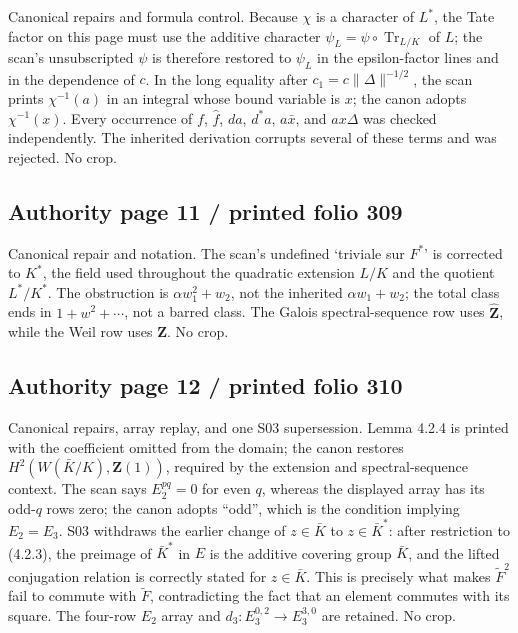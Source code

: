 \documentclass[10pt]{article}
\begin{document}
Canonical repairs and formula control. Because \(\chi\) is a character of \(L^*\), the Tate factor on this page must use the additive character \(\psi_L=\psi\circ\operatorname{Tr}_{L/K}\) of \(L\); the scan’s unsubscripted \(\psi\) is therefore restored to \(\psi_L\) in the epsilon-factor lines and in the dependence of \(c\). In the long equality after \(c_1=c\lVert\Delta\rVert^{-1/2}\), the scan prints \(\chi^{-1}(a)\) in an integral whose bound variable is \(x\); the canon adopts \(\chi^{-1}(x)\). Every occurrence of \(f\), \(\widehat f\), \(da\), \(d^*a\), \(a\bar x\), and \(ax\Delta\) was checked independently. The inherited derivation corrupts several of these terms and was rejected. No crop.\par

\subsection*{Authority page 11 / printed folio 309}

Canonical repair and notation. The scan’s undefined ‘triviale sur \(F^*\)’ is corrected to \(K^*\), the field used throughout the quadratic extension \(L/K\) and the quotient \(L^*/K^*\). The obstruction is \(\alpha w_1^2+w_2\), not the inherited \(\alpha w_1+w_2\); the total class ends in \(1+w^2+\cdots\), not a barred class. The Galois spectral-sequence row uses \(\widehat{\mathbf Z}\), while the Weil row uses \(\mathbf Z\). No crop.\par

\subsection*{Authority page 12 / printed folio 310}

Canonical repairs, array replay, and one S03 supersession. Lemma 4.2.4 is printed with the coefficient omitted from the domain; the canon restores \(H^2(W(\bar K/K),\mathbf Z(1))\), required by the extension and spectral-sequence context. The scan says \(E_2^{pq}=0\) for even \(q\), whereas the displayed array has its odd-\(q\) rows zero; the canon adopts “odd”, which is the condition implying \(E_2=E_3\). S03 withdraws the earlier change of \(z\in\bar K\) to \(z\in\bar K^*\): after restriction to (4.2.3), the preimage of \(\bar K^*\) in \(E\) is the additive covering group \(\bar K\), and the lifted conjugation relation is correctly stated for \(z\in\bar K\). This is precisely what makes \(\widetilde F^2\) fail to commute with \(\widetilde F\), contradicting the fact that an element commutes with its square. The four-row \(E_2\) array and \(d_3:E_3^{0,2}\to E_3^{3,0}\) are retained. No crop.\par
\end{document}

